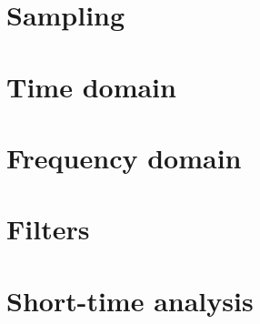 
\section{Sampling}
\begin{frame}
\end{frame}

\section{Time domain}
\begin{frame}
\end{frame}

\section{Frequency domain}
\begin{frame}
\end{frame}

\section{Filters}
\begin{frame}
\end{frame}

\section{Short-time analysis}
\begin{frame}
\end{frame}

